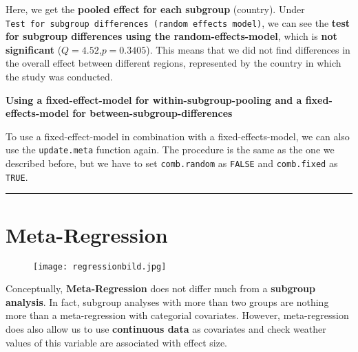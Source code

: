 \documentclass[]{book}
\theoremstyle{definition}
\theoremstyle{definition}
\theoremstyle{definition}
\theoremstyle{remark}
\begin{document}
Here, we get the \textbf{pooled effect for each subgroup} (country).
Under
\texttt{Test\ for\ subgroup\ differences\ (random\ effects\ model)}, we
can see the \textbf{test for subgroup differences using the
random-effects-model}, which is \textbf{not significant}
(\(Q=4.52\),\(p=0.3405\)). This means that we did not find differences
in the overall effect between different regions, represented by the
country in which the study was conducted.

\begin{rmdachtung}
\textbf{Using a fixed-effect-model for within-subgroup-pooling and a
fixed-effects-model for between-subgroup-differences}

To use a fixed-effect-model in combination with a fixed-effects-model,
we can also use the \texttt{update.meta} function again. The procedure
is the same as the one we described before, but we have to set
\texttt{comb.random} as \texttt{FALSE} and \texttt{comb.fixed} as
\texttt{TRUE}.
\end{rmdachtung}

\begin{center}\rule{0.5\linewidth}{\linethickness}\end{center}

\chapter{Meta-Regression}\label{meta-regression}

\begin{figure}
\centering
\texttt{[image: regressionbild.jpg]}
\caption{}
\end{figure}

Conceptually, \textbf{Meta-Regression} does not differ much from a
\textbf{subgroup analysis}. In fact, subgroup analyses with more than
two groups are nothing more than a meta-regression with categorial
covariates. However, meta-regression does also allow us to use
\textbf{continuous data} as covariates and check weather values of this
variable are associated with effect size.
\end{document}
